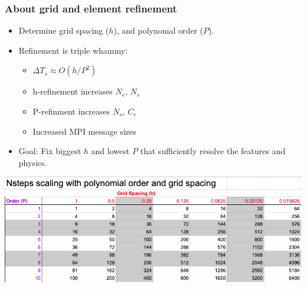 \begin{frame}\frametitle{About grid and element refinement}
\begin{multicols}{2}
\begin{itemize}
\item Determine grid spacing ($h$), and polynomal order ($P$).
\item Refinement is triple whammy:
\begin{itemize}
\item $\Delta{T_s} \approx O(h / P^2)$
\item h-refinement increases $N_e$, $N_s$
\item P-refinment increases $N_s$, $C_e$
\item Increased MPI message sizes
\end{itemize}
\item Goal: Fix biggest $h$ and lowest $P$ that sufficiently resolve the features and physics.
\end{itemize}
\end{multicols}
\begin{center}
\includegraphics[width=.9\textwidth]{figures/hprefinement_steps.png}
\end{center}
\end{frame}

